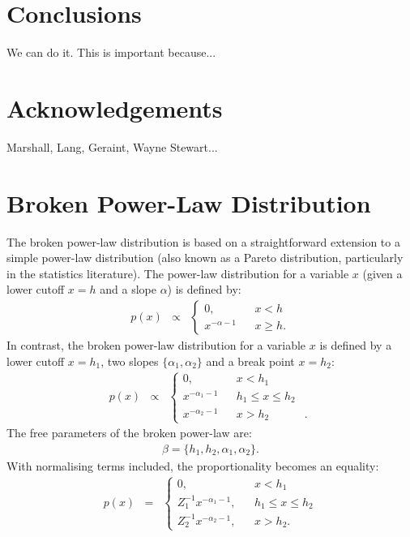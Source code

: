 \documentclass[manuscript]{aastex}
\begin{document}
\section{Conclusions}
We can do it. This is important because...

\section{Acknowledgements}
Marshall, Lang, Geraint, Wayne Stewart...


\appendix

\section{Broken Power-Law Distribution}\label{power_law}
The broken power-law distribution is based on a straightforward extension
to a simple power-law distribution (also known as a Pareto distribution,
particularly in the statistics literature). The power-law distribution for a
variable $x$ (given a lower cutoff $x=h$ and a slope $\alpha$) is defined by:
\begin{eqnarray}
p(x) &\propto&
\left\{
\begin{array}{lcr}
0, & & x < h \\
x^{-\alpha - 1} & & x \geq h.
\end{array}
\right.
\end{eqnarray}
In contrast, the broken power-law distribution for a variable $x$ is defined by
a lower cutoff $x=h_1$, two slopes $\{\alpha_1, \alpha_2\}$ and a break point
$x=h_2$:
\begin{eqnarray}
p(x) &\propto&
\left\{
\begin{array}{lcrl}
0, & & x < h_1 & \\
x^{-\alpha_1 - 1} & & h_1 \leq x \leq h_2 & \\
x^{-\alpha_2 - 1} & & x > h_2 & .
\end{array}
\right.
\end{eqnarray}
The free parameters of the broken power-law are:
\begin{eqnarray}
\beta = \{h_1, h_2, \alpha_1, \alpha_2\}.
\end{eqnarray}
With normalising terms included, the proportionality becomes an equality:
\begin{eqnarray}
p(x) &=&
\left\{
\begin{array}{lcr}
0, & & x < h_1 \\
Z_1^{-1}x^{-\alpha_1 - 1}, & & h_1 \leq x \leq h_2 \\
Z_2^{-1}x^{-\alpha_2 - 1}, & & x > h_2.
\end{array}
\right.
\end{eqnarray}
\end{document}
